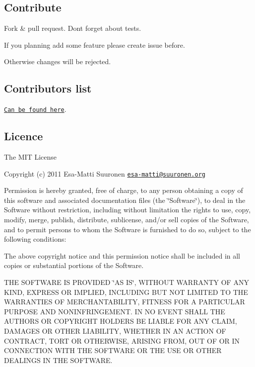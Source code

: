 \subsection*{Contribute}


\begin{DoxyItemize}
\item Fork \& pull request. Don\textquotesingle{}t forget about tests.
\item If you planning add some feature please create issue before.
\end{DoxyItemize}

Otherwise changes will be rejected.

\subsection*{Contributors list}

\href{https://github.com/epeli/underscore.string/graphs/contributors}{\tt Can be found here}.

\subsection*{Licence}

The M\+IT License

Copyright (c) 2011 Esa-\/\+Matti Suuronen \href{mailto:esa-matti@suuronen.org}{\tt esa-\/matti@suuronen.\+org}

Permission is hereby granted, free of charge, to any person obtaining a copy of this software and associated documentation files (the \char`\"{}\+Software\char`\"{}), to deal in the Software without restriction, including without limitation the rights to use, copy, modify, merge, publish, distribute, sublicense, and/or sell copies of the Software, and to permit persons to whom the Software is furnished to do so, subject to the following conditions\+:

The above copyright notice and this permission notice shall be included in all copies or substantial portions of the Software.

T\+HE S\+O\+F\+T\+W\+A\+RE IS P\+R\+O\+V\+I\+D\+ED \char`\"{}\+A\+S I\+S\char`\"{}, W\+I\+T\+H\+O\+UT W\+A\+R\+R\+A\+N\+TY OF A\+NY K\+I\+ND, E\+X\+P\+R\+E\+SS OR I\+M\+P\+L\+I\+ED, I\+N\+C\+L\+U\+D\+I\+NG B\+UT N\+OT L\+I\+M\+I\+T\+ED TO T\+HE W\+A\+R\+R\+A\+N\+T\+I\+ES OF M\+E\+R\+C\+H\+A\+N\+T\+A\+B\+I\+L\+I\+TY, F\+I\+T\+N\+E\+SS F\+OR A P\+A\+R\+T\+I\+C\+U\+L\+AR P\+U\+R\+P\+O\+SE A\+ND N\+O\+N\+I\+N\+F\+R\+I\+N\+G\+E\+M\+E\+NT. IN NO E\+V\+E\+NT S\+H\+A\+LL T\+HE A\+U\+T\+H\+O\+RS OR C\+O\+P\+Y\+R\+I\+G\+HT H\+O\+L\+D\+E\+RS BE L\+I\+A\+B\+LE F\+OR A\+NY C\+L\+A\+IM, D\+A\+M\+A\+G\+ES OR O\+T\+H\+ER L\+I\+A\+B\+I\+L\+I\+TY, W\+H\+E\+T\+H\+ER IN AN A\+C\+T\+I\+ON OF C\+O\+N\+T\+R\+A\+CT, T\+O\+RT OR O\+T\+H\+E\+R\+W\+I\+SE, A\+R\+I\+S\+I\+NG F\+R\+OM, O\+UT OF OR IN C\+O\+N\+N\+E\+C\+T\+I\+ON W\+I\+TH T\+HE S\+O\+F\+T\+W\+A\+RE OR T\+HE U\+SE OR O\+T\+H\+ER D\+E\+A\+L\+I\+N\+GS IN T\+HE S\+O\+F\+T\+W\+A\+RE. 
